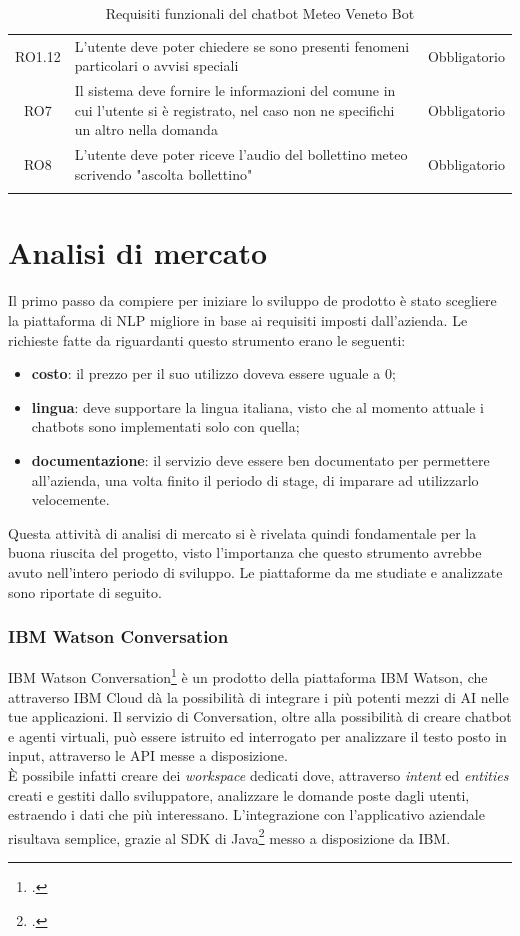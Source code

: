 \begin{longtable}{|c|>{\centering}m{7cm}|c|}
RO1.12 & L'utente deve poter chiedere se sono presenti fenomeni particolari o avvisi speciali & Obbligatorio\\ 
RO7 & Il sistema deve fornire le informazioni del comune in cui l'utente si è registrato, nel caso non ne specifichi un altro nella domanda & Obbligatorio\\
RO8 & L'utente deve poter riceve l'audio del bollettino meteo scrivendo "ascolta bollettino" & Obbligatorio\\ 
\hline
\caption{Requisiti funzionali del chatbot Meteo Veneto Bot}
\end{longtable}

\section{Analisi di mercato}
\label{nlp}
Il primo passo da compiere per iniziare lo sviluppo de prodotto è stato scegliere la piattaforma di \gls{NLP} migliore in base ai requisiti imposti dall'azienda. Le richieste fatte da \azienda{} riguardanti questo strumento erano le seguenti:
\begin{itemize}
	\item \textbf{costo}: il prezzo per il suo utilizzo doveva essere uguale a 0;
	\item \textbf{lingua}: deve supportare la lingua italiana, visto che al momento attuale i \glspl{chatbot} sono implementati solo con quella;
	\item \textbf{documentazione}: il servizio deve essere ben documentato per permettere all'azienda, una volta finito il periodo di stage, di imparare ad utilizzarlo velocemente.
\end{itemize}

Questa attività di analisi di mercato si è rivelata quindi fondamentale per la buona riuscita del progetto, visto l'importanza che questo strumento avrebbe avuto nell'intero periodo di sviluppo. Le piattaforme da me studiate e analizzate sono riportate di seguito.

\subsubsection{IBM Watson Conversation}
IBM Watson Conversation\footcite{watson} è un prodotto della piattaforma IBM Watson, che attraverso IBM Cloud dà la possibilità di integrare i più potenti mezzi di \gls{AI} nelle tue applicazioni. Il servizio di Conversation, oltre alla possibilità di creare \gls{chatbot} e agenti virtuali, può essere istruito ed interrogato per analizzare il testo posto in input, attraverso le \gls{API} messe a disposizione.\\
È possibile infatti creare dei \emph{workspace} dedicati dove, attraverso \emph{intent} ed \emph{entities} creati e gestiti dallo sviluppatore, analizzare le domande poste dagli utenti, estraendo i dati che più interessano. L'integrazione con l'applicativo aziendale risultava semplice, grazie al \gls{SDK} di Java\footcite{watsonSDK} messo a disposizione da IBM.

